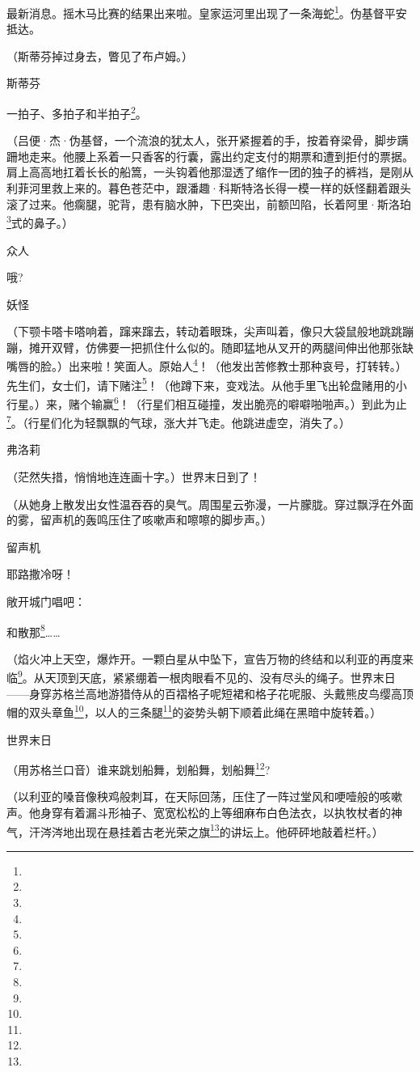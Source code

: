 \par 最新消息。摇木马比赛的结果出来啦。皇家运河里出现了一条海蛇\footnote{}。伪基督平安抵达。
\par （斯蒂芬掉过身去，瞥见了布卢姆。）
\par 斯蒂芬
\par 一拍子、多拍子和半拍子\footnote{}。
\par （吕便·杰·伪基督，一个流浪的犹太人，张开紧握着的手，按着脊梁骨，脚步蹒跚地走来。他腰上系着一只香客的行囊，露出约定支付的期票和遭到拒付的票据。肩上高高地扛着长长的船篙，一头钩着他那湿透了缩作一团的独子的裤裆，是刚从利菲河里救上来的。暮色苍茫中，跟潘趣·科斯特洛长得一模一样的妖怪翻着跟头滚了过来。他瘸腿，驼背，患有脑水肿，下巴突出，前额凹陷，长着阿里·斯洛珀\footnote{}式的鼻子。）
\par 众人
\par 哦?
\par 妖怪
\par （下颚卡嗒卡嗒响着，蹿来蹿去，转动着眼珠，尖声叫着，像只大袋鼠般地跳跳蹦蹦，摊开双臂，仿佛要一把抓住什么似的。随即猛地从叉开的两腿间伸出他那张缺嘴唇的脸。）出来啦！笑面人。原始人\footnote{}！（他发出苦修教士那种哀号，打转转。）先生们，女士们，请下赌注\footnote{}！（他蹲下来，变戏法。从他手里飞出轮盘赌用的小行星。）来，赌个输赢\footnote{}！（行星们相互碰撞，发出脆亮的噼噼啪啪声。）到此为止\footnote{}。（行星们化为轻飘飘的气球，涨大并飞走。他跳进虚空，消失了。）
\par 弗洛莉
\par （茫然失措，悄悄地连连画十字。）世界末日到了！
\par （从她身上散发出女性温吞吞的臭气。周围星云弥漫，一片朦胧。穿过飘浮在外面的雾，留声机的轰鸣压住了咳嗽声和嚓嚓的脚步声。）
\par 留声机
\par 耶路撒冷呀！
\par 敞开城门唱吧：
\par 和散那\footnote{}……
\par （焰火冲上天空，爆炸开。一颗白星从中坠下，宣告万物的终结和以利亚的再度来临\footnote{}。从天顶到天底，紧紧绷着一根肉眼看不见的、没有尽头的绳子。世界末日——身穿苏格兰高地游猎侍从的百褶格子呢短裙和格子花呢服、头戴熊皮鸟缨高顶帽的双头章鱼\footnote{}，以人的三条腿\footnote{}的姿势头朝下顺着此绳在黑暗中旋转着。）
\par 世界末日
\par （用苏格兰口音）谁来跳划船舞，划船舞，划船舞\footnote{}?
\par （以利亚的嗓音像秧鸡般刺耳，在天际回荡，压住了一阵过堂风和哽噎般的咳嗽声。他身穿有着漏斗形袖子、宽宽松松的上等细麻布白色法衣，以执牧杖者的神气，汗涔涔地出现在悬挂着古老光荣之旗\footnote{}的讲坛上。他砰砰地敲着栏杆。）
